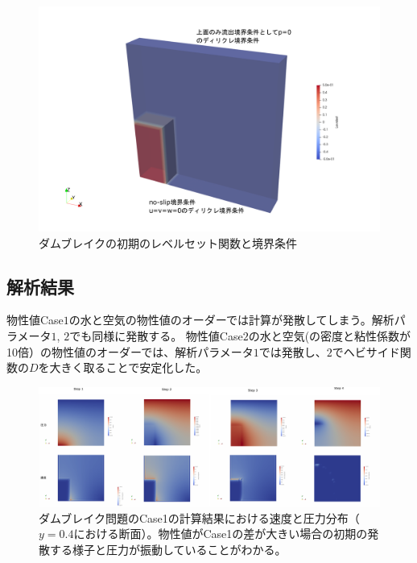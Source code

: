 \documentclass[8pt,a4paper]{article}
\begin{document}
\begin{figure}[H]
	\centering
	\includegraphics[width=18truecm]{pics/3d-dambreak/levelset_init.pdf}
	\caption{ダムブレイクの初期のレベルセット関数と境界条件}
	\label{fig:3d-dambreak-mesh}
\end{figure}

\subsection{解析結果}

物性値Case$1$の水と空気の物性値のオーダーでは計算が発散してしまう。解析パラメータ$1$, $2$でも同様に発散する。
物性値Case$2$の水と空気(の密度と粘性係数が10倍）の物性値のオーダーでは、解析パラメータ$1$では発散し、$2$でヘビサイド関数の$D$を大きく取ることで安定化した。

\begin{figure}[H]
	\centering
	\includegraphics[width=18truecm]{pics/3d-dambreak/diverge_water_air.pdf}
	\caption{ダムブレイク問題のCase1の計算結果における速度と圧力分布（$y=0.4$における断面）。物性値がCase1の差が大きい場合の初期の発散する様子と圧力が振動していることがわかる。}
	\label{fig:3d-dambreak-diverge}
\end{figure}
\end{document}
